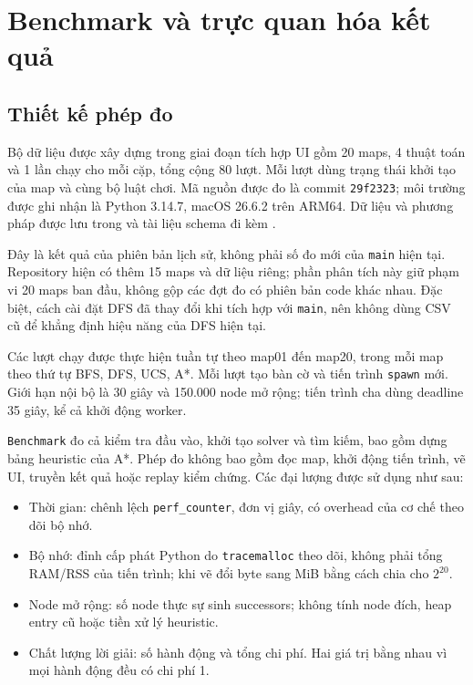 \section{Benchmark và trực quan hóa kết quả}
\label{sec:benchmark}

\subsection{Thiết kế phép đo}

Bộ dữ liệu được xây dựng trong giai đoạn tích hợp UI gồm 20 maps,
4 thuật toán và 1 lần chạy cho mỗi cặp, tổng cộng 80 lượt. Mỗi lượt dùng
trạng thái khởi tạo của map và cùng bộ luật chơi. Mã nguồn được đo là
commit \texttt{29f2323}; môi trường được ghi nhận là Python 3.14.7,
macOS 26.6.2 trên ARM64. Dữ liệu và phương pháp được lưu trong
 và tài liệu schema đi kèm
\cite{bloxorz_benchmark_data}.

Đây là kết quả của phiên bản lịch sử, không phải số đo mới của
\texttt{main} hiện tại. Repository hiện có thêm 15 maps và dữ liệu riêng;
phần phân tích này giữ phạm vi 20 maps ban đầu, không gộp các đợt đo có
phiên bản code khác nhau. Đặc biệt, cách cài đặt DFS đã thay đổi khi tích
hợp với \texttt{main}, nên không dùng CSV cũ để khẳng định hiệu năng của
DFS hiện tại.

Các lượt chạy được thực hiện tuần tự theo map01 đến map20, trong mỗi map
theo thứ tự BFS, DFS, UCS, A*. Mỗi lượt tạo bàn cờ và tiến trình
\texttt{spawn} mới. Giới hạn nội bộ là 30 giây và 150.000 node mở rộng;
tiến trình cha dùng deadline 35 giây, kể cả khởi động worker.

\texttt{Benchmark} đo cả kiểm tra đầu vào, khởi tạo solver và tìm kiếm,
bao gồm dựng bảng heuristic của A*. Phép đo không bao gồm đọc map,
khởi động tiến trình, vẽ UI, truyền kết quả hoặc replay kiểm chứng.
Các đại lượng được sử dụng như sau:
\begin{itemize}
    \item Thời gian: chênh lệch \texttt{perf\_counter}, đơn vị giây, có
    overhead của cơ chế theo dõi bộ nhớ.
    \item Bộ nhớ: đỉnh cấp phát Python do \texttt{tracemalloc} theo dõi,
    không phải tổng RAM/RSS của tiến trình; khi vẽ đổi byte sang MiB
    bằng cách chia cho $2^{20}$.
    \item Node mở rộng: số node thực sự sinh successors; không tính
    node đích, heap entry cũ hoặc tiền xử lý heuristic.
    \item Chất lượng lời giải: số hành động và tổng chi phí. Hai giá trị
    bằng nhau vì mọi hành động đều có chi phí 1.
\end{itemize}

